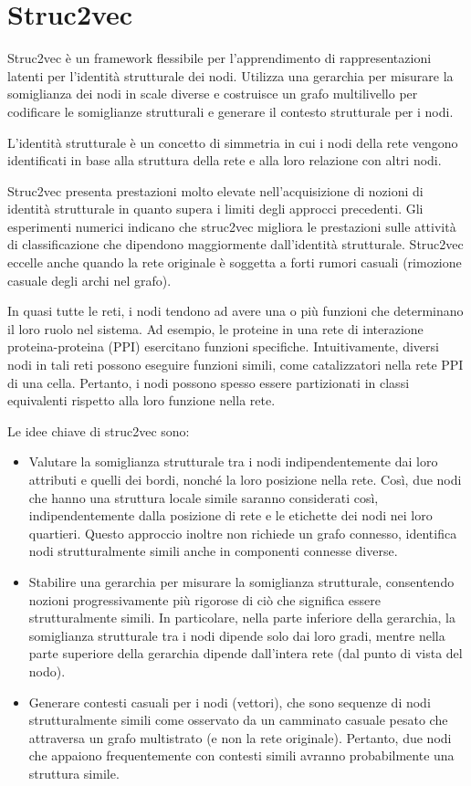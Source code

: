 \documentclass[11pt]{article}
\begin{document}
\pagebreak
\section{Struc2vec}
Struc2vec è un framework flessibile per l'apprendimento di rappresentazioni latenti per l'identità strutturale dei nodi.
Utilizza una gerarchia per misurare la somiglianza dei nodi in scale diverse e costruisce un grafo multilivello per codificare le somiglianze strutturali e generare il contesto strutturale per i nodi.

L'identità strutturale è un concetto di simmetria in cui i nodi della rete vengono identificati in base alla struttura della rete e alla loro relazione con altri nodi.

Struc2vec presenta prestazioni molto elevate nell'acquisizione di nozioni di identità strutturale in quanto supera i limiti degli approcci precedenti.
Gli esperimenti numerici indicano che struc2vec migliora le prestazioni sulle attività di classificazione che dipendono maggiormente dall'identità strutturale.
Struc2vec eccelle anche quando la rete originale è soggetta a forti rumori casuali (rimozione casuale degli archi nel grafo).

In quasi tutte le reti, i nodi tendono ad avere una o più funzioni che determinano il loro ruolo nel sistema. Ad esempio, le proteine in una rete di interazione proteina-proteina (PPI) esercitano funzioni specifiche. 
Intuitivamente, diversi nodi in tali reti possono eseguire funzioni simili, come catalizzatori nella rete PPI di una cella. Pertanto, i nodi possono spesso essere partizionati in classi equivalenti rispetto alla loro funzione nella rete.

Le idee chiave di struc2vec sono:
\begin{itemize}
  \item Valutare la somiglianza strutturale tra i nodi indipendentemente dai loro attributi e quelli dei bordi, nonché la loro posizione nella rete.
Così, due nodi che hanno una struttura locale simile saranno considerati così, indipendentemente dalla posizione di rete e le etichette dei nodi nei loro quartieri.
Questo approccio inoltre non richiede un grafo connesso, identifica nodi strutturalmente simili anche in componenti connesse diverse.
  \item Stabilire una gerarchia per misurare la somiglianza strutturale, consentendo nozioni progressivamente più rigorose di ciò che significa essere strutturalmente simili.
In particolare, nella parte inferiore della gerarchia, la somiglianza strutturale tra i nodi dipende solo dai loro gradi, mentre nella parte superiore della gerarchia dipende dall'intera rete (dal punto di vista del nodo).
  \item Generare contesti casuali per i nodi (vettori), che sono sequenze di nodi strutturalmente simili come osservato da un camminato casuale pesato che attraversa un grafo multistrato (e non la rete originale). 
Pertanto, due nodi che appaiono frequentemente con contesti simili avranno probabilmente una struttura simile.
\end{itemize}
\end{document}
